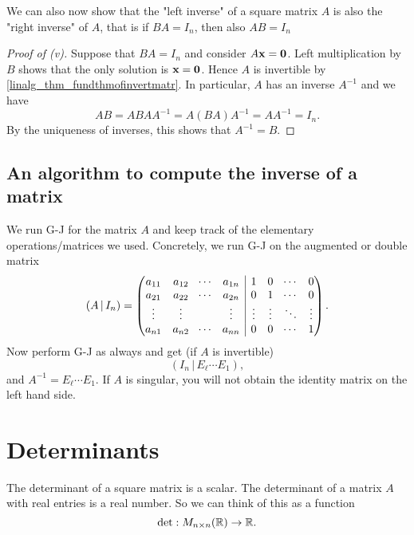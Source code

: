 \documentclass[10pt, a4paper]{article}
\begin{document}
\begin{remark}
    We can also now show that the "left inverse" of a square matrix $A$ is also the "right inverse" of $A$,
    that is if $BA = I_n$, then also $AB = I_n$
\end{remark}

\begin{proposition}[continues = prop:propofinvandtransp]
    \begin{proof}[Proof of (v)]
        Suppose that $BA = I_n$ and consider $A\mathbf{x} = \mathbf{0}$.
        Left multiplication by $B$ shows that the only solution is $\mathbf{x} = \mathbf{0}$.
        Hence $A$ is invertible by \autoref{linalg_thm_fundthmofinvertmatr}.
        In particular, $A$ has an inverse $A ^ {-1}$ and we have
        \[
        AB = ABAA ^ {-1} = A(BA)A ^ {-1} = AA ^ {-1} = I_n.
        \]
        By the uniqueness of inverses, this shows that $A ^ {-1} = B$.
    \end{proof}
\end{proposition}

\subsection{An algorithm to compute the inverse of a matrix}
We run G-J for the matrix $A$ and keep track of the elementary operations/matrices we used.
Concretely, we run G-J on the augmented or double matrix
\[
(A \,|\, I_n) =
\left(\hspace{-5pt}
\begin{array}{cccc|cccc}
     a_{1 1} & a_{1 2} & \dotsi & a_{1 n} & 1 & 0 & \dotsi & 0 \\
     a_{2 1} & a_{2 2} & \dotsi & a_{2 n} & 0 & 1 & \dotsi & 0 \\
     \vdots & \vdots & \phantom{} & \vdots & \vdots & \vdots & \ddots & \vdots \\
     a_{n 1} & a_{n 2} & \dotsi & a_{n n} & 0 & 0 & \dotsi & 1
\end{array}
\hspace{-5pt}\right).
\]
Now perform G-J as always and get (if $A$ is invertible)
\[
(I_n\,|\,E_\ell \dotsi E_1),
\]
and $A ^ {-1} = E_\ell \dotsi E_1$.
If $A$ is singular,
you will not obtain the identity matrix on the left hand side.

\newpage

\section{Determinants}
The determinant of a square matrix is a scalar.
The determinant of a matrix $A$ with real entries is a real number.
So we can think of this as a function
\[
\det : M_{n \times n}(\mathbb{R}) \rightarrow \mathbb{R}.
\]
\end{document}

